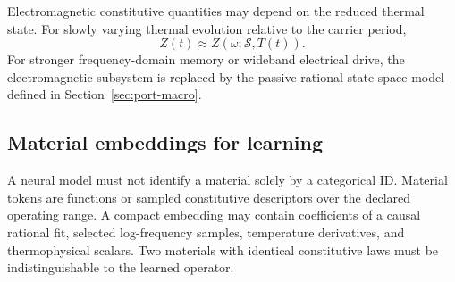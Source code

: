Electromagnetic constitutive quantities may depend on the reduced thermal state.
For slowly varying thermal evolution relative to the carrier period,
\[
  Z(t)\approx Z(\omega;\mathcal S,T(t)).
\]
For stronger frequency-domain memory or wideband electrical drive, the
electromagnetic subsystem is replaced by the passive rational state-space model
defined in Section~\ref{sec:port-macro}.

\subsection{Material embeddings for learning}

A neural model must not identify a material solely by a categorical ID.
Material tokens are functions or sampled constitutive descriptors over the
declared operating range. A compact embedding may contain coefficients of a
causal rational fit, selected log-frequency samples, temperature derivatives,
and thermophysical scalars. Two materials with identical constitutive laws must
be indistinguishable to the learned operator.
